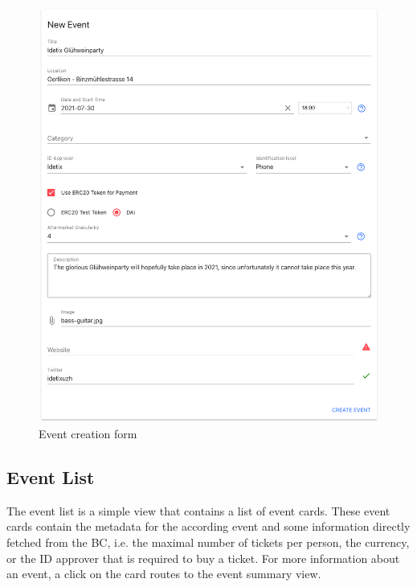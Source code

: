 \begin{figure}[H]
    \centering
    \includegraphics[width=15cm]{images/host-event-form.png}
    \caption{Event creation form \protect}
    \label{img:host-event-form}
\end{figure}

\subsection{Event List}
The event list is a simple view that contains a list of event cards. These event cards contain the metadata for the according event and some information directly fetched from the BC, i.e. the maximal number of tickets per person, the currency, or the ID approver that is required to buy a ticket. For more information about an event, a click on the card routes to the event summary view.

